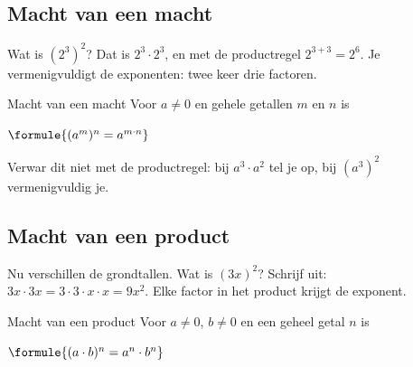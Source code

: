 \begin{oefeningen}
\end{oefeningen}

\subsection{Macht van een macht}

Wat is $(2^3)^2$? Dat is $2^3 \cdot 2^3$, en met de productregel $2^{3+3} = 2^6$. Je vermenigvuldigt de exponenten: twee keer drie factoren.

\begin{theorie}
\begin{stelling}{Macht van een macht}
Voor $a \neq 0$ en gehele getallen $m$ en $n$ is

\vspace{1mm}
\qquad $\formule{(a^m)^n = a^{m \cdot n}}$
\end{stelling}
\end{theorie}

Verwar dit niet met de productregel: bij $a^3 \cdot a^2$ tel je op, bij $(a^3)^2$ vermenigvuldig je.


\begin{oefeningen}
\end{oefeningen}

\subsection{Macht van een product}

Nu verschillen de grondtallen. Wat is $(3x)^2$? Schrijf uit: $3x \cdot 3x = 3 \cdot 3 \cdot x \cdot x = 9x^2$. Elke factor in het product krijgt de exponent.

\begin{theorie}
\begin{stelling}{Macht van een product}
Voor $a \neq 0$, $b \neq 0$ en een geheel getal $n$ is

\vspace{1mm}
\qquad $\formule{(a \cdot b)^n = a^n \cdot b^n}$
\end{stelling}
\end{theorie}

